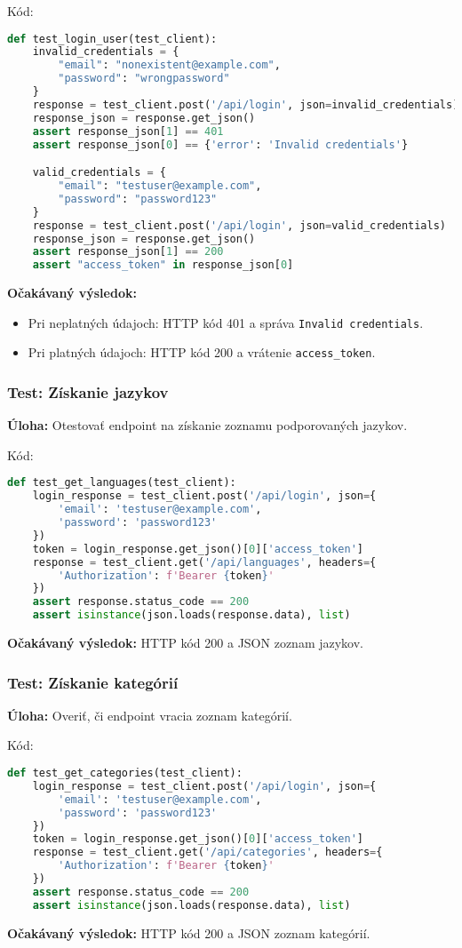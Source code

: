 \documentclass{article}
\begin{document}
Kód:
\begin{lstlisting}[language=Python]
def test_login_user(test_client):
    invalid_credentials = {
        "email": "nonexistent@example.com",
        "password": "wrongpassword"
    }
    response = test_client.post('/api/login', json=invalid_credentials)
    response_json = response.get_json()
    assert response_json[1] == 401
    assert response_json[0] == {'error': 'Invalid credentials'}

    valid_credentials = {
        "email": "testuser@example.com",
        "password": "password123"
    }
    response = test_client.post('/api/login', json=valid_credentials)
    response_json = response.get_json()
    assert response_json[1] == 200
    assert "access_token" in response_json[0]
\end{lstlisting}
\textbf{Očakávaný výsledok:}
\begin{itemize}
    \item Pri neplatných údajoch: HTTP kód 401 a správa \texttt{Invalid credentials}.
    \item Pri platných údajoch: HTTP kód 200 a vrátenie \texttt{access\_token}.
\end{itemize}

\subsubsection{Test: Získanie jazykov}
\textbf{Úloha:} Otestovať endpoint na získanie zoznamu podporovaných jazykov.

Kód:
\begin{lstlisting}[language=Python]
def test_get_languages(test_client):
    login_response = test_client.post('/api/login', json={
        'email': 'testuser@example.com',
        'password': 'password123'
    })
    token = login_response.get_json()[0]['access_token']
    response = test_client.get('/api/languages', headers={
        'Authorization': f'Bearer {token}'
    })
    assert response.status_code == 200
    assert isinstance(json.loads(response.data), list)
\end{lstlisting}
\textbf{Očakávaný výsledok:} HTTP kód 200 a JSON zoznam jazykov.

\subsubsection{Test: Získanie kategórií}
\textbf{Úloha:} Overiť, či endpoint vracia zoznam kategórií.

Kód:
\begin{lstlisting}[language=Python]
def test_get_categories(test_client):
    login_response = test_client.post('/api/login', json={
        'email': 'testuser@example.com',
        'password': 'password123'
    })
    token = login_response.get_json()[0]['access_token']
    response = test_client.get('/api/categories', headers={
        'Authorization': f'Bearer {token}'
    })
    assert response.status_code == 200
    assert isinstance(json.loads(response.data), list)
\end{lstlisting}
\textbf{Očakávaný výsledok:} HTTP kód 200 a JSON zoznam kategórií.
\end{document}
